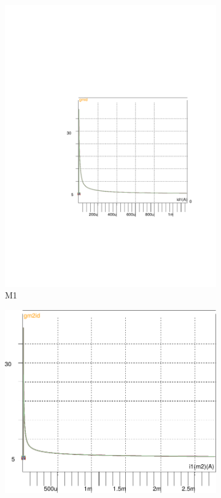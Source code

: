 \begin{figure}[!tbp]
   \begin{subfigure}[b]{0.3\textwidth}
   \includegraphics[width=\textwidth]{images/gmid_id_m1}
   \caption{M1}
   \label{fig:f1}
   \end{subfigure}
   \begin{subfigure}[b]{0.3\textwidth}
   \includegraphics[width=\textwidth]{images/gmid_id_m2}

\end{subfigure}
\end{figure}
